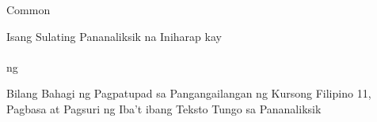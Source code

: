 \documentclass[class=scrartcl]{standalone}
\begin{document}
 {Common}
\begin {titlepage}
  \centering
	{\LARGE\researchtitle

  }
  \vfill
  {\Large Isang Sulating Pananaliksik na Iniharap kay\\
    \teacher\\
    ng\\
    \uppercase{\school}

  }
  \vspace{1cm}
  {\Large Bilang Bahagi ng Pagpatupad sa Pangangailangan ng Kursong
    Filipino 11, Pagbasa at Pagsuri ng Iba't ibang Teksto Tungo sa Pananaliksik

  }
  \vfill
  {\large\itshape \authors

  }
\end {titlepage}
\end{document}
